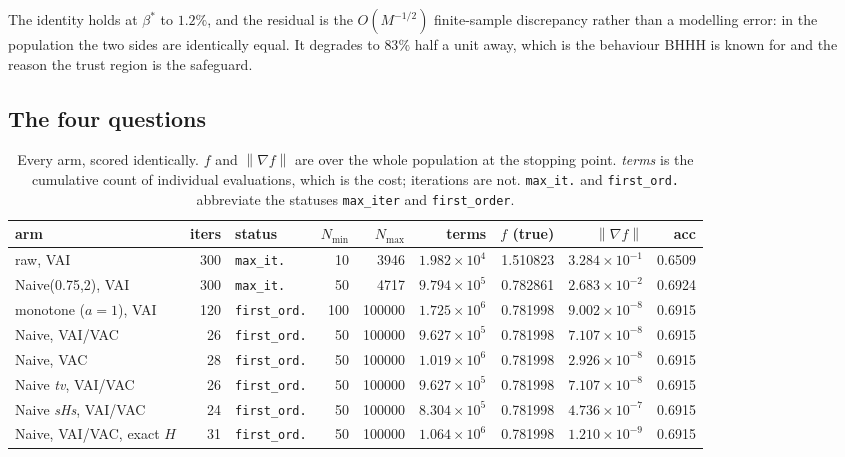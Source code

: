 \documentclass[11pt,a4paper]{article}
\providecommand{\norm}[1]{\left \lVert #1 \right \rVert}
\newcommand{\VAI}{\textsf{VAI}}
\newcommand{\VAIVAC}{\textsf{VAI/VAC}}
\newcommand{\VAC}{\textsf{VAC}}
\begin{document}
The identity holds at $\beta^*$ to $1.2\%$, and the residual is the
$O(M^{-1/2})$ finite-sample discrepancy rather than a modelling error: in the
population the two sides are identically equal. It degrades to $83\%$ half a unit
away, which is the behaviour BHHH is known for and the reason the trust region is
the safeguard.

\subsection{The four questions}

\begin{table}[H]
\centering
\caption{Every arm, scored identically. $f$ and $\norm{\nabla f}$ are over the whole
population at the stopping point. \emph{terms} is the cumulative count of individual
evaluations, which is the cost; iterations are not. \texttt{max\_it.} and
\texttt{first\_ord.} abbreviate the statuses \texttt{max\_iter} and
\texttt{first\_order}.}
\label{tab:all}
\footnotesize
\setlength{\tabcolsep}{3pt}
\begin{tabular}{lrlrrrrrr}
\toprule
arm & iters & status & $N_{\min}$ & $N_{\max}$ & terms & $f$ (true) & $\norm{\nabla f}$ & acc \\
\midrule
raw, \VAI{}                 & 300 & \texttt{max\_it.}  & 10  & 3946    & $1.982\times10^{4}$ & 1.510823 & $3.284\times10^{-1}$ & 0.6509 \\
Naive(0.75,2), \VAI{}       & 300 & \texttt{max\_it.}  & 50  & 4717    & $9.794\times10^{5}$ & 0.782861 & $2.683\times10^{-2}$ & 0.6924 \\
monotone ($a=1$), \VAI{}    & 120 & \texttt{first\_ord.} & 100 & 100000  & $1.725\times10^{6}$ & 0.781998 & $9.002\times10^{-8}$ & 0.6915 \\
Naive, \VAIVAC{}            &  26 & \texttt{first\_ord.} & 50  & 100000  & $9.627\times10^{5}$ & 0.781998 & $7.107\times10^{-8}$ & 0.6915 \\
Naive, \VAC{}               &  28 & \texttt{first\_ord.} & 50  & 100000  & $1.019\times10^{6}$ & 0.781998 & $2.926\times10^{-8}$ & 0.6915 \\
Naive \emph{tv}, \VAIVAC{}  &  26 & \texttt{first\_ord.} & 50  & 100000  & $9.627\times10^{5}$ & 0.781998 & $7.107\times10^{-8}$ & 0.6915 \\
Naive \emph{sHs}, \VAIVAC{} &  24 & \texttt{first\_ord.} & 50  & 100000  & $8.304\times10^{5}$ & 0.781998 & $4.736\times10^{-7}$ & 0.6915 \\
Naive, \VAIVAC{}, exact $H$ &  31 & \texttt{first\_ord.} & 50  & 100000  & $1.064\times10^{6}$ & 0.781998 & $1.210\times10^{-9}$ & 0.6915 \\
\bottomrule
\end{tabular}
\end{table}
\end{document}
